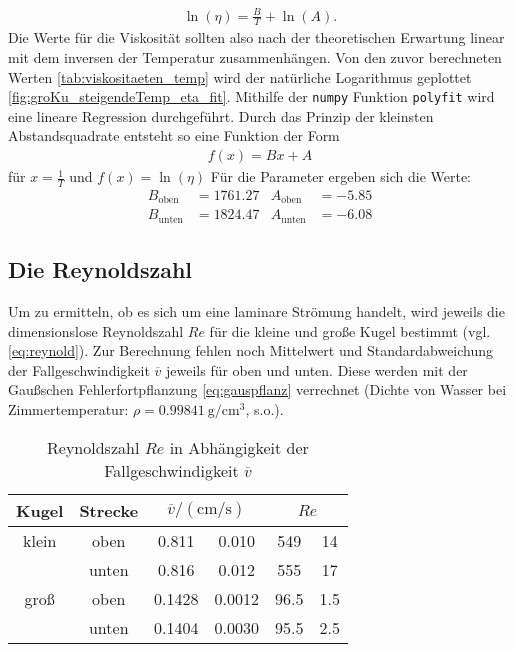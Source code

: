 \begin{align}
    \ln {\left( \eta \right)} = \frac{B}{T} + \ln{\left( A \right)}.
\end{align}
Die Werte für die Viskosität sollten also nach der theoretischen Erwartung linear mit dem inversen der Temperatur zusammenhängen.
Von den zuvor berechneten Werten \ref{tab:viskositaeten_temp} wird der natürliche Logarithmus geplottet \ref{fig:groKu_steigendeTemp_eta_fit}.
Mithilfe der \texttt{numpy} Funktion \texttt{polyfit} wird eine lineare Regression durchgeführt.
Durch das Prinzip der kleinsten Abstandsquadrate entsteht so eine Funktion der Form
\begin{align*}
    f(x) = B x + A 
\end{align*}
für $x= \frac{1}{T}$ und $f(x)= \ln (\eta)$
Für die Parameter ergeben sich die Werte:
\begin{align*}
    B_\text{oben} &= \num{1761.27} & A_\text{oben} &= \num{-5.85} \\
    B_\text{unten} &= \num{1824.47} & A_\text{unten} &= \num{-6.08}
\end{align*}


\subsection[]{Die Reynoldszahl}
Um zu ermitteln, ob es sich um eine laminare Strömung handelt, wird jeweils die dimensionslose Reynoldszahl $Re$ für die kleine und große Kugel bestimmt
(vgl. \eqref{eq:reynold}).
Zur Berechnung fehlen noch Mittelwert und Standardabweichung der Fallgeschwindigkeit $\overline{v}$ jeweils für oben und unten.
Diese werden mit der Gaußschen Fehlerfortpflanzung \eqref{eq:gauspflanz} verrechnet
(Dichte von Wasser bei Zimmertemperatur: $\rho = \qty{0.99841}{\g \per \cm^3}$, s.o.).

\begin{table}
    \caption[]{Reynoldszahl $Re$ in Abhängigkeit der Fallgeschwindigkeit $\overline{v}$}
    \label{tab:reynold}
    \centering
    \begin{tabular}[]{S S S[table-format=1.4] @{${}\pm{}$} S[table-format=1.4] S[table-format=4.1] @{${}\pm{}$} S[table-format=3.1]}
        \toprule
        {Kugel} & {Strecke} &  &  \\
        \bottomrule
        {klein} & {oben} & 0.811 & 0.010 & 549 & 14 \\
         & {unten} & 0.816 & 0.012 & 555 & 17 \\
        {groß} & {oben} & 0.1428 & 0.0012 & 96.5 & 1.5 \\
         & {unten} & 0.1404 & 0.0030 & 95.5 & 2.5 \\
    \end{tabular}
\end{table}


